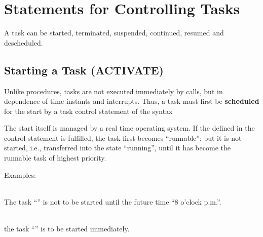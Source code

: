 


\section{Statements for Controlling Tasks}    %
\label{sec_tasking_statements}

A task can be started, terminated, suspended, continued, resumed and
descheduled.

\subsection{Starting a Task (ACTIVATE)}   %
\label{sec_task_activate}

Unlike procedures, tasks are not executed immediately by calls, but in
dependence of time instants and interrupts. Thus, a task must first be
{\bf scheduled} for the start by a task control statement of the
syntax

\begin{grammarframe}

\end{grammarframe}

The start itself is managed by a real time operating system. If
the  defined in the control statement is fulfilled,
the task first becomes ``runnable''; but it is not started, i.e.,
transferred into the state ``running'', until it has become the runnable
task of highest priority. %

Examples:

\\
The task ``'' is not to be started until the
future time ``8 o'clock p.m.''.

\\ 
the task ``'' is to be started immediately.


